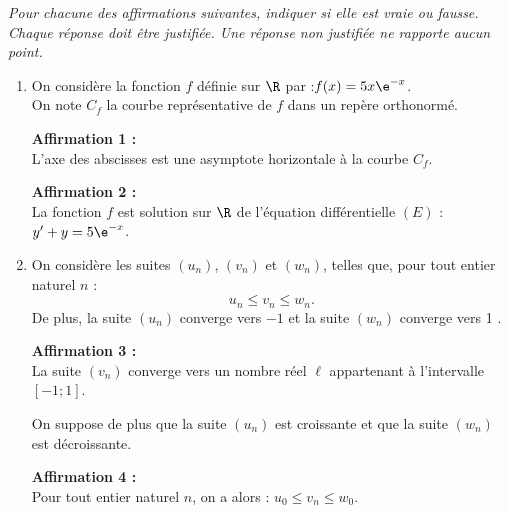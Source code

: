 \medskip
\emph{Pour chacune des affirmations suivantes, indiquer si elle est vraie ou fausse. Chaque réponse doit être justifiée. Une réponse non justifiée ne rapporte aucun point.
}
\begin{enumerate}
	\item On considère la fonction $f$ définie sur $\R$ par :\quad $f(x)=5 x \e^{-x}$.\\
	On note $C_{f}$ la courbe représentative de $f$ dans un repère orthonormé.

	\smallskip

	\textbf{Affirmation 1 :}\\
	L'axe des abscisses est une asymptote horizontale à la courbe $C_{f}$.

	\smallskip

	\textbf{Affirmation 2 :}\\
	La fonction $f$ est solution sur $\R$ de l'équation différentielle $(E)$ : $y'+y=5 \e^{-x}$.
	\smallskip

	\item On considère les suites $\left(u_{n}\right)$, $\left(v_{n}\right)$ et $\left(w_{n}\right)$, telles que, pour tout entier naturel $n$ :
	$$
	u_{n} \leqslant v_{n} \leqslant w_{n}.
	$$
	De plus, la suite $\left(u_{n}\right)$ converge vers $-1$ et la suite $\left(w_{n}\right)$ converge vers 1 .

	\smallskip
	\textbf{Affirmation 3 :}\\
	La suite $\left(v_{n}\right)$ converge vers un nombre réel $\ell$ appartenant à l'intervalle $[-1 ; 1]$.


	\smallskip
	On suppose de plus que la suite $\left(u_{n}\right)$ est croissante et que la suite $\left(w_{n}\right)$ est décroissante.

	\textbf{Affirmation 4 :}\\
	Pour tout entier naturel $n$, on a alors : \quad $u_{0} \leqslant v_{n} \leqslant w_{0}$.

\end{enumerate}

\medskip
